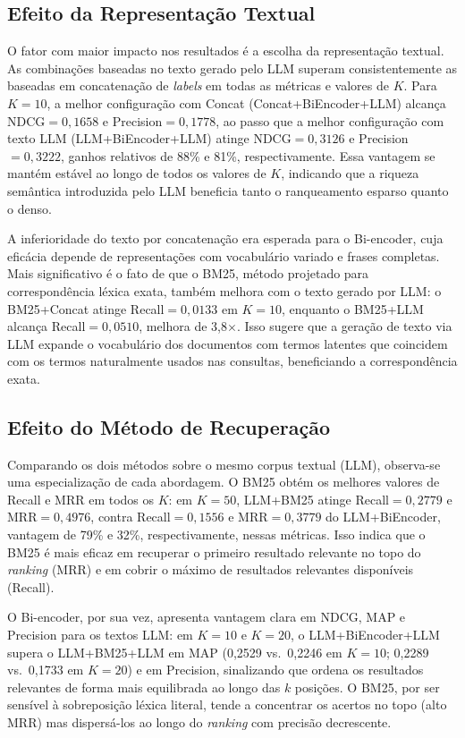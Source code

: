 \documentclass[portuguese]{sbc2025}
\begin{document}
\subsection{Efeito da Representação Textual}

O fator com maior impacto nos resultados é a escolha da representação textual.
As combinações baseadas no texto gerado pelo LLM superam consistentemente as
baseadas em concatenação de \textit{labels} em todas as métricas e valores de $K$.
Para $K=10$, a melhor configuração com Concat (Concat+BiEncoder+LLM) alcança
NDCG$=0{,}1658$ e Precision$=0{,}1778$, ao passo que a melhor configuração com
texto LLM (LLM+BiEncoder+LLM) atinge NDCG$=0{,}3126$ e Precision$=0{,}3222$,
ganhos relativos de 88\% e 81\%, respectivamente. Essa vantagem se mantém estável
ao longo de todos os valores de $K$, indicando que a riqueza semântica introduzida
pelo LLM beneficia tanto o ranqueamento esparso quanto o denso.

A inferioridade do texto por concatenação era esperada para o Bi-encoder, cuja
eficácia depende de representações com vocabulário variado e frases completas. Mais
significativo é o fato de que o BM25, método projetado para correspondência léxica
exata, também melhora com o texto gerado por LLM: o BM25+Concat atinge
Recall$=0{,}0133$ em $K=10$, enquanto o BM25+LLM alcança Recall$=0{,}0510$,
melhora de 3,8$\times$. Isso sugere que a geração de texto via LLM expande o
vocabulário dos documentos com termos latentes que coincidem com os termos
naturalmente usados nas consultas, beneficiando a correspondência exata.

\subsection{Efeito do Método de Recuperação}

Comparando os dois métodos sobre o mesmo corpus textual (LLM), observa-se uma
especialização de cada abordagem. O BM25 obtém os melhores valores de Recall e MRR
em todos os $K$: em $K=50$, LLM+BM25 atinge Recall$=0{,}2779$ e MRR$=0{,}4976$,
contra Recall$=0{,}1556$ e MRR$=0{,}3779$ do LLM+BiEncoder, vantagem de 79\% e
32\%, respectivamente, nessas métricas. Isso indica que o BM25 é mais eficaz em
recuperar o primeiro resultado relevante no topo do \textit{ranking} (MRR) e em
cobrir o máximo de resultados relevantes disponíveis (Recall).

O Bi-encoder, por sua vez, apresenta vantagem clara em NDCG, MAP e Precision para
os textos LLM: em $K=10$ e $K=20$, o LLM+BiEncoder+LLM supera o LLM+BM25+LLM em
MAP (0{,}2529 vs.\ 0{,}2246 em $K=10$; 0{,}2289 vs.\ 0{,}1733 em $K=20$) e em
Precision, sinalizando que ordena os resultados relevantes de forma mais equilibrada
ao longo das $k$ posições. O BM25, por ser sensível à sobreposição léxica literal,
tende a concentrar os acertos no topo (alto MRR) mas dispersá-los ao longo do
\textit{ranking} com precisão decrescente.
\end{document}
